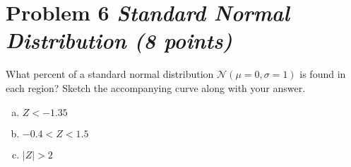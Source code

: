 \documentclass[11pt,twoside]{article}
\newcommand{\pts}[1]{\marginpar{ \small\hspace{0pt} \textit{[#1]} } }
\numberwithin{equation}{section}
\newcommand{\?}{\stackrel{?}{=}}
\begin{document}



  


  
  
 

  \eject
  \section*{Problem 6 \textit{Standard Normal Distribution (8 points)}}
What percent of a standard normal distribution $\mathcal{N} (\mu = 0, \sigma = 1)$ is found in each region? Sketch the accompanying curve along with your answer.
\begin{enumerate}[(a)]
\item $Z < - 1.35$ \marginpar{\it [2 pts]}
  \vspace{30ex}
  

\item $ -0.4 < Z < 1.5$ \marginpar{\it [3 pts]}
  \vspace{30ex}

\item $|Z| > 2$ \marginpar{\it [3 pts]}
  \vspace{30ex}
\end{enumerate}
\end{document}
